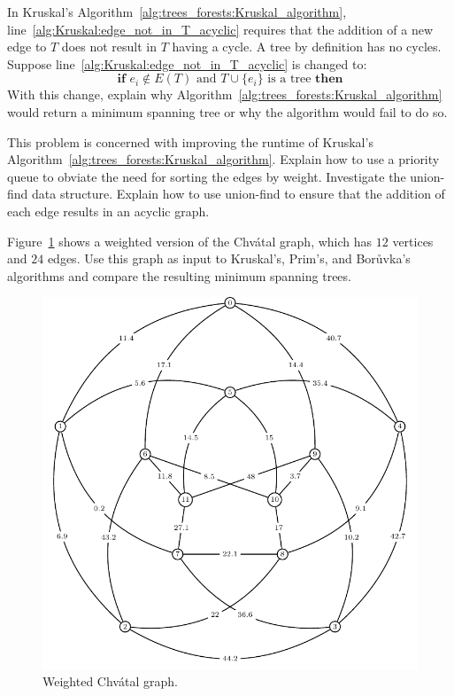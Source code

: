 \begin{problem}
\item In Kruskal's
  Algorithm~\ref{alg:trees_forests:Kruskal_algorithm},
  line~\ref{alg:Kruskal:edge_not_in_T_acyclic} requires that the
  addition of a new edge to $T$ does not result in $T$ having a
  cycle. A tree by definition has no cycles. Suppose
  line~\ref{alg:Kruskal:edge_not_in_T_acyclic} is changed to:
  \[
  \textbf{if } e_i \notin E(T)
  \text{ and }
  T \cup \{e_i\} \text{ is a tree } \textbf{then}
  \]
  With this change, explain why
  Algorithm~\ref{alg:trees_forests:Kruskal_algorithm} would return a
  minimum spanning tree or why the algorithm would fail to do so.

\item This problem is concerned with improving the runtime of
  Kruskal's
  Algorithm~\ref{alg:trees_forests:Kruskal_algorithm}. Explain how to
  use a priority queue to obviate the need for sorting the edges by
  weight. Investigate the union-find data
  structure. Explain how to use union-find to ensure that the addition
  of each edge results in an acyclic graph.

\item Figure~\ref{fig:trees_forests:weighted_Chvatal_graph} shows a
  weighted version of the Chv\'atal graph,
  which has $12$ vertices and $24$ edges. Use this graph as input to
  Kruskal's,
  Prim's, and
  Bor\r{u}vka's algorithms and compare
  the resulting minimum spanning trees.

\begin{figure}[!htbp]
\centering
{}
\includegraphics{image/trees-forests/weighted-Chvatal-graph}
\caption{Weighted Chv\'atal graph.}
\label{fig:trees_forests:weighted_Chvatal_graph}
\end{figure}


\end{problem}

